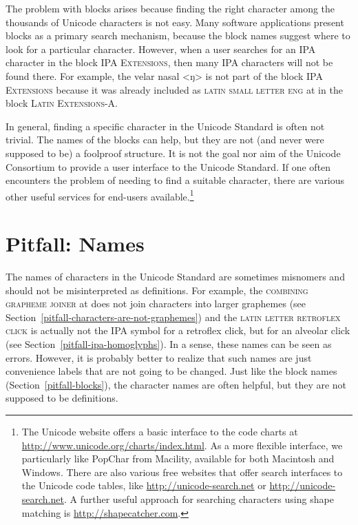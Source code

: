 The problem with blocks arises because finding the right character among the
thousands of Unicode characters is not easy. Many software applications present
blocks as a primary search mechanism, because the block names suggest where to
look for a particular character. However, when a user searches for an IPA
character in the block \textsc{IPA Extensions}, then many IPA characters will not
be found there. For example, the velar nasal <ŋ> is not part of the block
\textsc{IPA Extensions} because it was already included as \textsc{latin small letter
eng} at  in the block \textsc{Latin Extensions-A}.

In general, finding a specific character in the Unicode Standard is often not
trivial. The names of the blocks can help, but they are not (and never were supposed
to be) a foolproof structure. It is not the goal nor aim of the Unicode
Consortium to provide a user interface to the Unicode Standard. If one often
encounters the problem of needing to find a suitable character, there are
various other useful services for end-users available.\footnote{The Unicode
website offers a basic interface to the code charts at
\url{http://www.unicode.org/charts/index.html}. As a more flexible interface, we
particularly like PopChar from Macility, available for both Macintosh and
Windows. There are also various free websites that offer search interfaces
to the Unicode code tables, like \url{http://unicode-search.net} or
\url{http://unicode-search.net}. A further useful approach for searching characters
using shape matching is \url{http://shapecatcher.com}.}

\section{Pitfall: Names}
\label{pitfall-names}

The names of characters in the Unicode Standard are sometimes misnomers and
should not be misinterpreted as definitions. For example, the \textsc{combining
grapheme joiner} at  does not join characters into larger graphemes
(see Section~\ref{pitfall-characters-are-not-graphemes}) and the \textsc{latin
letter retroflex click}  is actually not the IPA symbol for a
retroflex click, but for an alveolar click (see
Section~\ref{pitfall-ipa-homoglyphs}). In a sense, these names can be seen as
errors. However, it is probably better to realize that such names are just
convenience labels that are not going to be changed. Just like the block names
(Section~\ref{pitfall-blocks}), the character names are often helpful, but they
are not supposed to be definitions.

